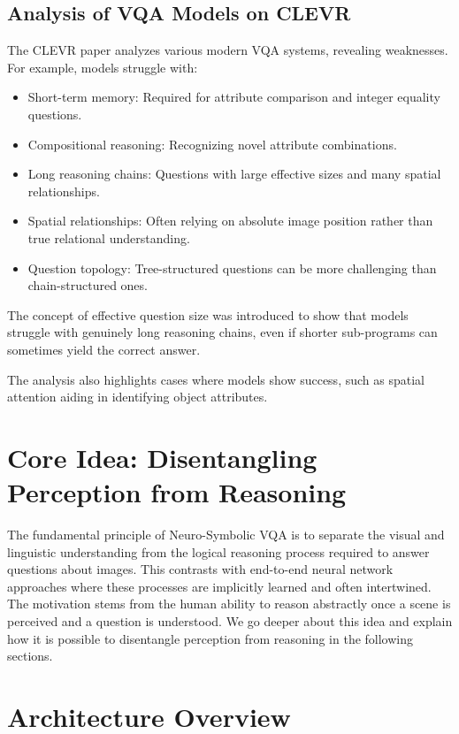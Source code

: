 \documentclass[10pt, oneside]{article}
\begin{document}
\subsection{Analysis of VQA Models on CLEVR}
The CLEVR paper \citep{Johnson2017a} analyzes various modern VQA systems, revealing weaknesses. For example, models struggle with:
\begin{itemize}
    \item Short-term memory: Required for attribute comparison and integer equality questions.
    \item Compositional reasoning: Recognizing novel attribute combinations.
    \item Long reasoning chains: Questions with large effective sizes and many spatial relationships.
    \item Spatial relationships: Often relying on absolute image position rather than true relational understanding.
    \item Question topology: Tree-structured questions can be more challenging than chain-structured ones.
\end{itemize}

The concept of effective question size was introduced to show that models struggle with genuinely long reasoning chains, even if shorter sub-programs can sometimes yield the correct answer.

The analysis also highlights cases where models show success, such as spatial attention aiding in identifying object attributes.

\section{Core Idea: Disentangling Perception from Reasoning}
The fundamental principle of Neuro-Symbolic VQA is to separate the visual and linguistic understanding from the logical reasoning process required to answer questions about images. This contrasts with end-to-end neural network approaches where these processes are implicitly learned and often intertwined. The motivation stems from the human ability to reason abstractly once a scene is perceived and a question is understood. We go deeper about this idea and explain how it is possible to disentangle perception from reasoning in the following sections.

\section{Architecture Overview}
\end{document}

